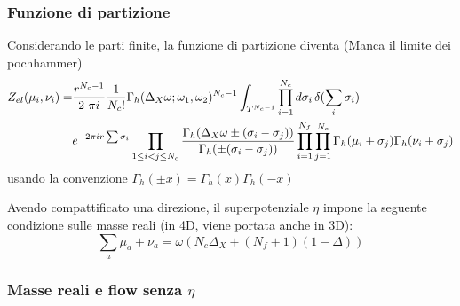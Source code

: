 \documentclass[a4paper,12pt]{report}
\begin{document}
\subsubsection{Funzione di partizione}
Considerando le parti finite, la funzione di partizione diventa
(Manca il limite dei pochhammer)
\begin{align*}
Z_{el} ( \mu_i , \nu_i ) = &
 \frac{r^{N_c-1}}{2 \ \pi i }{1 \over N_c ! } 
\Gamma_h ( \Delta_X \omega ; \omega_1 , \omega_2)^{N_c-1}
\int_{T^{N_c-1}}  
\prod_{i=1}^{N_c} d \sigma_i \, \delta( \sum_i \sigma_i) \, \\
 & e^{- 2 \pi i r \sum \sigma_i} 
 \prod_{ 1 \leq i<j \leq N_c} \frac{ \Gamma_h( \Delta_X \omega \pm (\sigma_i - \sigma_j)) }{ \Gamma_h ( \pm (\sigma_i - \sigma_j) )} 
 \prod_{i=1}^{N_f} \prod_{j=1}^{N_c} \Gamma_h ( \mu_i + \sigma_j) \Gamma_h ( \nu_i + \sigma_j)
\end{align*}
usando la convenzione $ \Gamma_h ( \pm x ) = \Gamma_h (x) \Gamma_h( -x)$

Avendo compattificato una direzione, il superpotenziale $\eta$ impone la seguente condizione sulle masse reali (in 4D, viene portata anche in 3D):
$$
 \sum_a \mu_a + \nu_a  = \omega ( N_c \Delta_X + (N_f+1) ( 1 - \Delta))
$$
\subsubsection{Masse reali e flow senza $\eta$}
\end{document}
